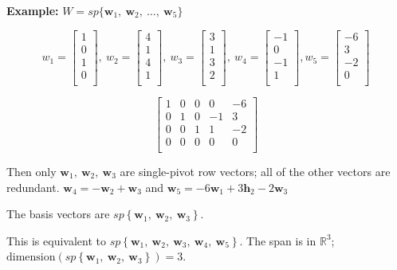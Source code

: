 \documentclass[12pt]{article}
\theoremstyle{plain}
\theoremstyle{remark}
\theoremstyle{definition}
\begin{document}
\textbf{Example:}
\(W = sp\{{\mathbf{w}}_{1},\ {\mathbf{w}}_{2},\ \ldots,\ {\mathbf{w}}_{5}\}\)

\[w_{1} = \begin{bmatrix}
1 \\
0 \\
1 \\
0 \\
\end{bmatrix},\ w_{2} = \begin{bmatrix}
4 \\
1 \\
4 \\
1 \\
\end{bmatrix},\ w_{3} = \begin{bmatrix}
3 \\
1 \\
3 \\
2 \\
\end{bmatrix},\ w_{4} = \begin{bmatrix}
 - 1 \\
0 \\
 - 1 \\
1 \\
\end{bmatrix},w_{5} = \begin{bmatrix}
 - 6 \\
3 \\
 - 2 \\
0 \\
\end{bmatrix}\ \]

\[\begin{bmatrix}
1 & 0 & 0 & 0 & - 6 \\
0 & 1 & 0 & - 1 & 3 \\
0 & 0 & 1 & 1 & - 2 \\
0 & 0 & 0 & 0 & 0 \\
\end{bmatrix}\ \]

Then only
\({\mathbf{w}}_{1},\ {\mathbf{w}}_{2},\ {\mathbf{w}}_{3}\)
are single-pivot row vectors; all of the other vectors are redundant.
\({\mathbf{w}}_{4} = - {\mathbf{w}}_{2} + {\mathbf{w}}_{3}\)
and
\({\mathbf{w}}_{5} = - 6{\mathbf{w}}_{1} + {3\mathbf{h}}_{2} - 2{\mathbf{w}}_{3}\)

The basis vectors are
\(sp\left\{ {\mathbf{w}}_{1},\ {\mathbf{w}}_{2},\ {\mathbf{w}}_{3} \right\}\).

This is equivalent to
\(sp\left\{ {\mathbf{w}}_{1},\ {\mathbf{w}}_{2},\ {\mathbf{w}}_{3},\ {\mathbf{w}}_{4},\ {\mathbf{w}}_{5} \right\}\).
The span is in \(\mathbb{R}^{3}\);
\(\text{dimension}\left( sp\left\{ {\mathbf{w}}_{1},\ {\mathbf{w}}_{2},\ {\mathbf{w}}_{3} \right\} \right) = 3\).
\end{document}
